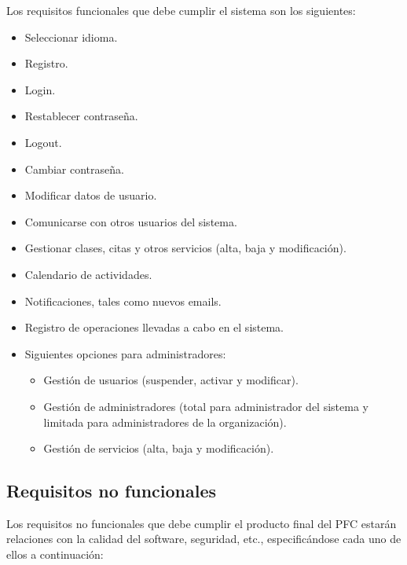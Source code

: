 Los requisitos funcionales que debe cumplir el sistema son los siguientes: 

\begin{itemize}
\item Seleccionar idioma.
\item Registro.
\item Login.
\item Restablecer contraseña.
\item Logout.
\item Cambiar contraseña.
\item Modificar datos de usuario.
\item Comunicarse con otros usuarios del sistema.
\item Gestionar clases, citas y otros servicios (alta, baja y modificación).
\item Calendario de actividades.
\item Notificaciones, tales como nuevos emails.
\item Registro de operaciones llevadas a cabo en el sistema.
\item Siguientes opciones para administradores:
\begin{itemize}
\item Gestión de usuarios (suspender, activar y modificar).
\item Gestión de administradores (total para administrador del sistema y limitada para administradores de la organización).
\item Gestión de servicios (alta, baja y modificación).
\end{itemize}
\end{itemize}


\subsection{Requisitos no funcionales}\label{subsec:requisitos-no-funcionales}

Los requisitos no funcionales que debe cumplir el producto final del PFC estarán relaciones con la calidad del software, seguridad, etc., especificándose cada uno de ellos a continuación: 

